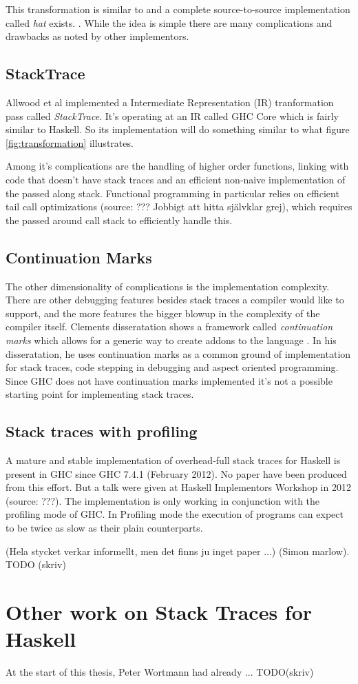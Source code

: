 This transformation is similar to
\cite{ghc_wiki_explicitcs_transformation}  and a complete
source-to-source implementation called \emph{hat} exists.
\cite{hat_website}.  While the idea is simple there are many
complications and drawbacks as noted by other implementors.

\subsection{StackTrace}

Allwood et al implemented a Intermediate Representation (IR) tranformation
pass called \emph{StackTrace}. It's operating at an IR called GHC Core which
is fairly similar to Haskell. So its implementation will do something
similar to what figure \ref{fig:transformation} illustrates.

Among it's complications are the
handling of higher order functions, linking with code that doesn't have stack
traces and an efficient non-naive implementation of the
passed along stack. \cite{FindingTheNeedle2009}
Functional programming in particular relies on efficient tail call
optimizations (source: ??? Jobbigt att hitta självklar grej), which
requires the passed around call stack to efficiently handle this.

\subsection{Continuation Marks}

The other dimensionality of complications is the implementation
complexity.  There are other debugging features besides stack traces a
compiler would like to support, and the more features the bigger blowup
in the complexity of the compiler itself.  Clements disseratation shows
a framework called \emph{continuation marks} which allows for a generic
way to create addons to the language \cite{clements_dissertation2005} .
In his disseratation, he uses continuation marks as a common ground of
implementation for stack traces, code stepping in debugging and aspect
oriented programming.  Since GHC does not have continuation marks
implemented it's not a possible starting point for implementing stack
traces.

\subsection{Stack traces with profiling}

A mature and stable implementation of overhead-full stack traces for
Haskell is present in GHC since GHC 7.4.1 (February 2012). No paper have
been produced from this effort. But a talk were given at Haskell
Implementors Workshop in 2012 (source: ???). The implementation is only
working in conjunction with the profiling mode of GHC. In Profiling mode
the execution of programs can expect to be twice as slow as their plain
counterparts.

(Hela stycket verkar informellt, men det finns ju inget paper ...)
(Simon marlow). TODO (skriv) %


\section{Other work on Stack Traces for Haskell}

At the start of this thesis, Peter Wortmann had already ... TODO(skriv) %
